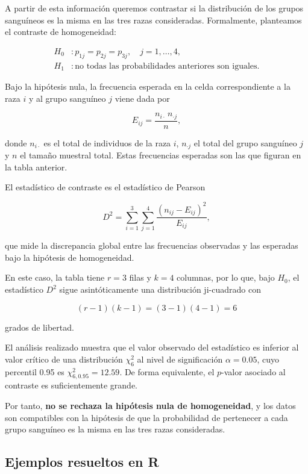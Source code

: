 \documentclass[
]{article}
\begin{document}
A partir de esta información queremos contrastar si la distribución de los grupos sanguíneos es la misma en las tres razas consideradas. Formalmente, planteamos el contraste de homogeneidad:

\[
\begin{aligned}
H_0 &: p_{1j}=p_{2j}=p_{3j}, \quad j=1,\ldots,4, \\
H_1 &: \text{no todas las probabilidades anteriores son iguales}.
\end{aligned}
\]

Bajo la hipótesis nula, la frecuencia esperada en la celda correspondiente a la raza \(i\) y al grupo sanguíneo \(j\) viene dada por

\[
E_{ij}=\frac{n_{i\cdot}\,n_{\cdot j}}{n},
\]

donde \(n_{i\cdot}\) es el total de individuos de la raza \(i\), \(n_{\cdot j}\) el total del grupo sanguíneo \(j\) y \(n\) el tamaño muestral total. Estas frecuencias esperadas son las que figuran en la tabla anterior.

El estadístico de contraste es el estadístico de Pearson

\[
D^{2}
=
\sum_{i=1}^{3}\sum_{j=1}^{4}
\frac{(n_{ij}-E_{ij})^{2}}{E_{ij}},
\]

que mide la discrepancia global entre las frecuencias observadas y las esperadas bajo la hipótesis de homogeneidad.

En este caso, la tabla tiene \(r=3\) filas y \(k=4\) columnas, por lo que, bajo \(H_{0}\), el estadístico \(D^{2}\) sigue asintóticamente una distribución ji-cuadrado con

\[
(r-1)(k-1)=(3-1)(4-1)=6
\]

grados de libertad.

El análisis realizado muestra que el valor observado del estadístico es inferior al valor crítico de una distribución \(\chi^{2}_{6}\) al nivel de significación \(\alpha=0.05\), cuyo percentil 0.95 es \(\chi^{2}_{6,0.95}=12.59\). De forma equivalente, el \(p\)-valor asociado al contraste es suficientemente grande.

Por tanto, \textbf{no se rechaza la hipótesis nula de homogeneidad}, y los datos son compatibles con la hipótesis de que la probabilidad de pertenecer a cada grupo sanguíneo es la misma en las tres razas consideradas.

\subsection{Ejemplos resueltos en R}\label{ejemplos-resueltos-en-r}
\end{document}
